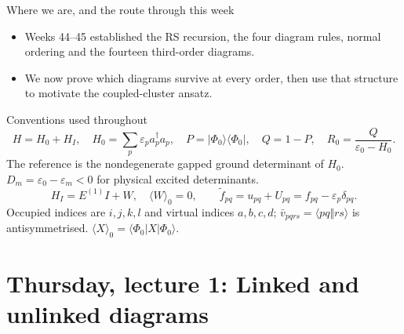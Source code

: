 \documentclass[aspectratio=169,10pt]{beamer}
\newcommand{\ketbra}[2]{\vert #1\rangle\langle #2\vert}
\newcommand{\mel}[3]{\langle #1\lvert #2\rvert #3\rangle}
\newcommand{\av}[1]{\langle #1\rangle_0}
\newcommand{\cre}[1]{a_{#1}^{\dagger}}
\newcommand{\ann}[1]{a_{#1}}
\newcommand{\ph}{\Phi_0}
\begin{document}
\begin{frame}{Where we are, and the route through this week}
\begin{itemize}
\item Weeks 44--45 established the RS recursion, the four diagram rules, normal ordering and the fourteen third-order diagrams.
\item We now prove which diagrams survive at every order, then use that structure to motivate the coupled-cluster ansatz.
\end{itemize}
\begin{block}{Conventions used throughout}
\[
 H=H_0+H_I,\quad H_0=\sum_p\varepsilon_p\cre p\ann p,\quad
 P=\ketbra{\ph}{\ph},\quad Q=1-P,\quad R_0=\frac{Q}{\varepsilon_0-H_0}.
\]
The reference is the nondegenerate gapped ground determinant of $H_0$.
$D_m=\varepsilon_0-\varepsilon_m<0$ for physical excited determinants.
\[
 H_I=E^{(1)}I+W,\quad\av W=0,\qquad
 \tilde f_{pq}=u_{pq}+U_{pq}=f_{pq}-\varepsilon_p\delta_{pq}.
\]
Occupied indices are $i,j,k,l$ and virtual indices $a,b,c,d$; $\bar v_{pqrs}=\langle pq\Vert rs\rangle$ is antisymmetrised. $\av X=\mel{\ph}{X}{\ph}$.
\end{block}
\end{frame}

\section[Thursday 1: Linked diagrams]{Thursday, lecture 1: Linked and unlinked diagrams}
\end{document}
